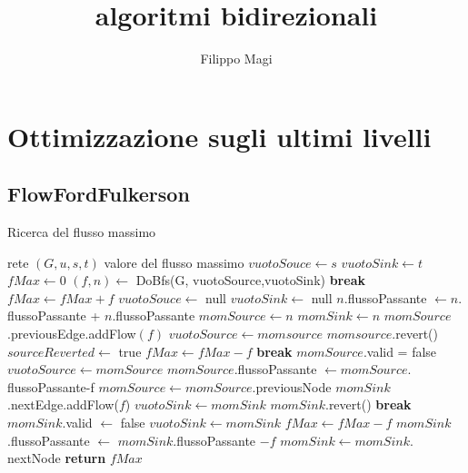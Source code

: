 \documentclass{article}
\title{algoritmi bidirezionali}
\author{Filippo Magi }
\begin{document}
\maketitle
\section{Ottimizzazione sugli ultimi livelli}
\subsection{FlowFordFulkerson}
\begin{algorithm}
    \caption{Ricerca del flusso massimo}
    \begin{algorithmic}[1]
        \REQUIRE rete $(G,u,s,t)$
        \ENSURE valore del flusso massimo
        \STATE $vuotoSouce \leftarrow s $
        \STATE $vuotoSink \leftarrow t$
        \STATE $fMax \leftarrow 0$
        \STATE $(f,n) \leftarrow$ DoBfs(G, vuotoSource,vuotoSink)
        \STATE \textbf{break}
        \ENDIF
        \STATE $fMax \leftarrow fMax + f$
        \STATE $vuotoSouce \leftarrow$ null
        \STATE $vuotoSink \leftarrow$ null
        \STATE $n$.flussoPassante $\leftarrow n.$flussoPassante + $n$.flussoPassante
        \STATE $momSource \leftarrow n$
        \STATE $momSink \leftarrow n$
        \STATE $momSource$.previousEdge.addFlow$(f)$
        \STATE $vuotoSource \leftarrow momsource$
        \STATE $momsource$.revert() 
        \STATE $sourceReverted \leftarrow$ true
        \STATE $fMax \leftarrow fMax - f$
        \STATE \textbf{break}
        \ELSE
        \STATE $momSource$.valid = false
        \STATE $vuotoSource \leftarrow momSource$
        \ENDIF
        \STATE $momSource.$flussoPassante $\leftarrow momSource.$flussoPassante-f
        \STATE $momSource \leftarrow momSource.$previousNode
        \ENDIF
        \ENDWHILE
        \STATE $momSink$.nextEdge.addFlow($f$)
        \STATE $vuotoSink \leftarrow momSink$
        \STATE $momSink$.revert()
        \STATE \textbf{break}
        \ELSE
        \STATE $momSink.$valid $\leftarrow$ false
        \STATE $vuotoSink \leftarrow momSink$
        \STATE $fMax \leftarrow fMax - f$
        \ENDIF
        \STATE $momSink$.flussoPassante $\leftarrow$ $momSink$.flussoPassante $-f$
        \STATE $momSink \leftarrow momSink.$nextNode
        \ENDIF
        \ENDWHILE
        \ENDIF
        \ENDWHILE
        \STATE \textbf{return} $fMax$
    \end{algorithmic}
\end{algorithm}
\end{document}
